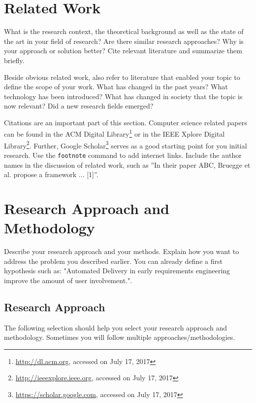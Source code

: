 \documentclass[a4paper]{article}
\begin{document}
\section{Related Work}

What is the research context, the theoretical background as well as the state of the art in your field of research?
Are there similar research approaches?
Why is your approach or solution better?
Cite relevant literature and summarize them briefly.

Beside obvious related work, also refer to literature that enabled your topic to define the scope of your work.
What has changed in the past years?
What technology has been introduced?
What has changed in society that the topic is now relevant?
Did a new research fields emerged?

Citations are an important part of this section.
Computer science related papers can be found in the ACM Digital Library\footnote{\url{http://dl.acm.org}, accessed on July 17, 2017} or in the IEEE Xplore Digital Library\footnote{\url{http://ieeexplore.ieee.org}, accessed on July 17, 2017}.
Further, Google Scholar\footnote{\url{https://scholar.google.com}, accessed on July 17, 2017} serves as a good starting point for you initial research.
Use the \verb+footnote+ command to add internet links.
Include the author names in the discussion of related work, such as ''In their paper ABC, Bruegge et al. propose a framework ... [1]''.

\section{Research Approach and Methodology}

Describe your research approach and your methods. Explain how you want to address the problem you described earlier. You can already define a first hypothesis such as: "Automated Delivery in early requirements engineering improve the amount of user involvement.".

\subsection{Research Approach} 

The following selection should help you select your research approach and methodology.
 Sometimes you will follow multiple approaches/methodologies.
 
\end{document}
